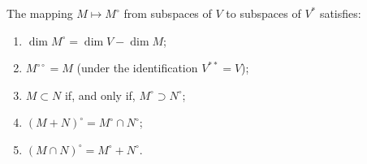 The mapping $M \mapsto M^\circ$ from subspaces of $V$ to subspaces of $V^*$ satisfies:
\begin{enumerate}
\item $\dim M^\circ = \dim V - \dim M$;
\item $M^{\circ\circ} = M$ (under the identification $V^{**} = V$);
\item $M \subset N$ if, and only if, $M^\circ \supset N^\circ$;
\item $(M + N)^\circ = M^\circ \cap N^\circ$;
\item $(M \cap N)^\circ = M^\circ + N^\circ$.
\end{enumerate}
